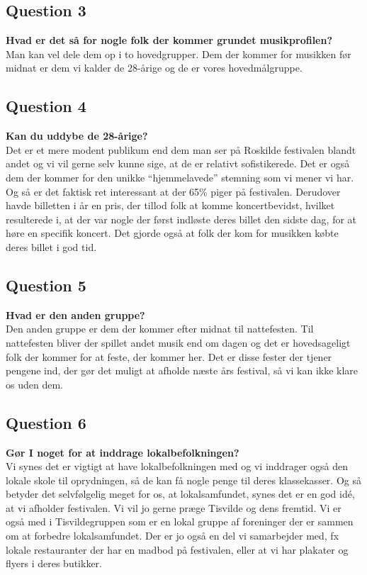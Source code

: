 \subsection{Question 3}
\label{i2q3}
\noindent \textbf{Hvad er det så for nogle folk der kommer grundet musikprofilen?} \\
Man kan vel dele dem op i to hovedgrupper. Dem der kommer for musikken før midnat er dem vi kalder de 28-årige og de er vores hovedmålgruppe. 

\subsection{Question 4}
\label{i2q4}
\noindent \textbf{Kan du uddybe de 28-årige?} \\
Det er et mere modent publikum end dem man ser på Roskilde festivalen blandt andet og vi vil gerne selv kunne sige, at de er relativt sofistikerede. Det er også dem der kommer for den unikke “hjemmelavede” stemning som vi mener vi har. Og så er det faktisk ret interessant at der 65\% piger på festivalen. Derudover havde billetten i år en pris, der tillod folk at komme koncertbevidst, hvilket resulterede i, at der var nogle der først indløste deres billet den sidste dag, for at høre en specifik koncert. Det gjorde også at folk der kom for musikken købte deres billet i god tid.

\subsection{Question 5}
\label{i2q5}
\noindent \textbf{Hvad er den anden gruppe?} \\
Den anden gruppe er dem der kommer efter midnat til nattefesten. Til nattefesten bliver der spillet andet musik end om dagen og det er hovedsageligt folk der kommer for at feste, der kommer her. Det er disse fester der tjener pengene ind, der gør det muligt at afholde næste års festival, så vi kan ikke klare os uden dem. 

\subsection{Question 6}
\label{i2q6}
\noindent \textbf{Gør I noget for at inddrage lokalbefolkningen?} \\
Vi synes det er vigtigt at have lokalbefolkningen med og vi inddrager også den lokale skole til oprydningen, så de kan få nogle penge til deres klassekasser. Og så betyder det selvfølgelig meget for os, at lokalsamfundet, synes det er en god idé, at vi afholder festivalen. Vi vil jo gerne præge Tisvilde og dens fremtid. Vi er også med i Tisvildegruppen som er en lokal gruppe af foreninger der er sammen om at forbedre lokalsamfundet. Der er jo også en del vi samarbejder med, fx lokale restauranter der har en madbod på festivalen, eller at vi har plakater og flyers i deres butikker.


